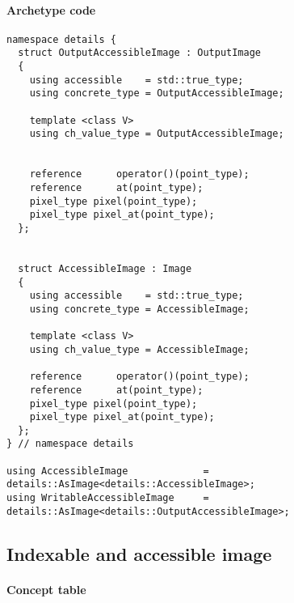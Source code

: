 \paragraph{Archetype code}
\begin{verbatim}
namespace details {
  struct OutputAccessibleImage : OutputImage
  {
    using accessible    = std::true_type;
    using concrete_type = OutputAccessibleImage;

    template <class V>
    using ch_value_type = OutputAccessibleImage;


    reference      operator()(point_type);
    reference      at(point_type);
    pixel_type pixel(point_type);
    pixel_type pixel_at(point_type);
  };


  struct AccessibleImage : Image
  {
    using accessible    = std::true_type;
    using concrete_type = AccessibleImage;

    template <class V>
    using ch_value_type = AccessibleImage;

    reference      operator()(point_type);
    reference      at(point_type);
    pixel_type pixel(point_type);
    pixel_type pixel_at(point_type);
  };
} // namespace details

using AccessibleImage             = details::AsImage<details::AccessibleImage>;
using WritableAccessibleImage     = details::AsImage<details::OutputAccessibleImage>;
\end{verbatim}


\clearpage

\subsection{Indexable and accessible image}

\paragraph{Concept table}

